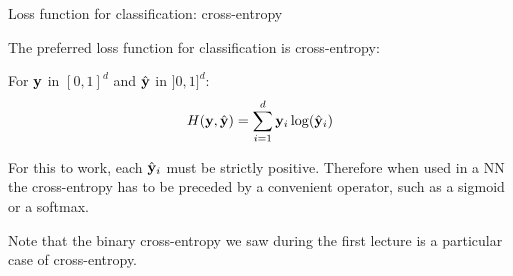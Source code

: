 \documentclass[xcolor=pdftex,dvipsnames,table,mathserif]{beamer}
\begin{document}
\begin{frame}{Loss function for classification: cross-entropy}

  The preferred loss function for classification is cross-entropy:

  \begin{block}{}
    For $\mathbf{y}$ in $[0, 1]^d$ and $\hat{\mathbf{y}}$ in $]0, 1]^d$:
        \[
        H(\mathbf{y}, \hat{\mathbf{y}}) = \sum_{i=1}^d \mathbf{y}_i \log(\hat{\mathbf{y}}_i)
        \]
  \end{block}

  \pause

  \begin{alertblock}{}
    For this to work, each $\hat{\mathbf{y}}_i$ must be strictly positive. Therefore when used in a NN the cross-entropy has to be preceded by a convenient operator, such as a sigmoid or a softmax.
  \end{alertblock}

  \pause

  Note that the binary cross-entropy we saw during the first lecture is a particular case of cross-entropy.


\end{frame}




\end{document}
